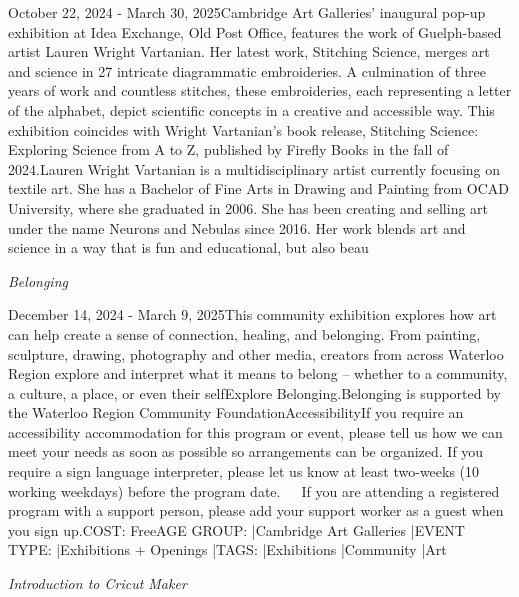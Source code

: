 \documentclass[letterpaper, 10pt]{article}
\newcommand{\subtitle}[1]{\textit{\large #1}\vspace{0.5em}}
\newcommand{\articlecontent}[1]{\small #1\vspace{1em}}
\begin{document}
\begin{multicols}{2}
{October 22, 2024 - March 30, 2025Cambridge Art Galleries' inaugural pop-up exhibition at Idea Exchange, Old Post Office, features the work of Guelph-based artist Lauren Wright Vartanian. Her latest work, Stitching Science, merges art and science in 27 intricate diagrammatic embroideries. A culmination of three years of work and countless stitches, these embroideries, each representing a letter of the alphabet, depict scientific concepts in a creative and accessible way. This exhibition coincides with Wright Vartanian’s book release, Stitching Science: Exploring Science from A to Z, published by Firefly Books in the fall of 2024.Lauren Wright Vartanian is a multidisciplinary artist currently focusing on textile art. She has a Bachelor of Fine Arts in Drawing and Painting from OCAD University, where she graduated in 2006. She has been creating and selling art under the name Neurons and Nebulas since 2016. Her work blends art and science in a way that is fun and educational, but also beau
}
\vspace{10px}

\subtitle{Belonging}

\articlecontent{

\qrcode[height=1.5cm]{https://ideaexchange.libnet.info/event/12094559}
\vspace{10px}

December 14, 2024 - March 9, 2025This community exhibition explores how art can help create a sense of connection, healing, and belonging. From painting, sculpture, drawing, photography and other media, creators from across Waterloo Region explore and interpret what it means to belong – whether to a community, a culture, a place, or even their selfExplore Belonging.Belonging is supported by the Waterloo Region Community FoundationAccessibilityIf you require an accessibility accommodation for this program or event, please tell us how we can meet your needs as soon as possible so arrangements can be organized. If you require a sign language interpreter, please let us know at least two-weeks (10 working weekdays) before the program date.   If you are attending a registered program with a support person, please add your support worker as a guest when you sign up.COST: FreeAGE GROUP: |Cambridge Art Galleries |EVENT TYPE: |Exhibitions + Openings |TAGS: |Exhibitions |Community |Art
}
\vspace{10px}

\subtitle{Introduction to Cricut Maker}

\articlecontent{

}
\end{multicols}
\end{document}

